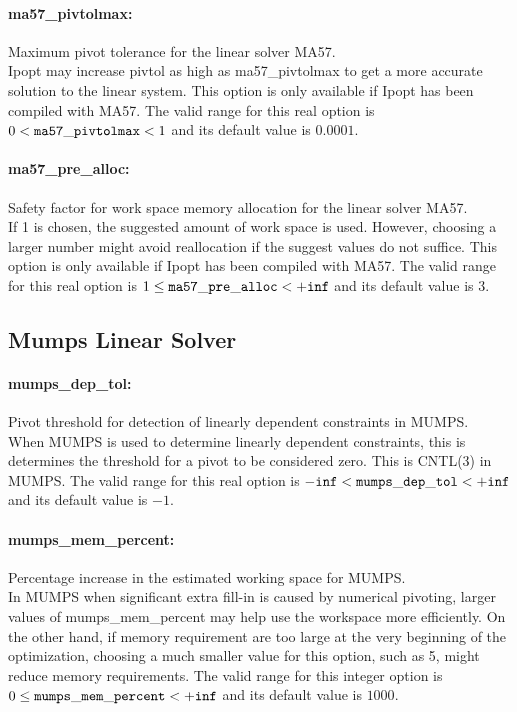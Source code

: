 \paragraph{ma57\_pivtolmax:}\label{sec:ma57_pivtolmax} Maximum pivot tolerance for the linear solver MA57. $\;$ \\
 Ipopt may increase pivtol as high as
ma57\_pivtolmax to get a more accurate solution
to the linear system.  This option is only
available if Ipopt has been compiled with MA57. The valid range for this real option is 
$0 <  {\tt ma57\_pivtolmax } <  1$
and its default value is $0.0001$.


\paragraph{ma57\_pre\_alloc:}\label{sec:ma57_pre_alloc} Safety factor for work space memory allocation for the linear solver MA57. $\;$ \\
 If 1 is chosen, the suggested amount of work
space is used.  However, choosing a larger number
might avoid reallocation if the suggest values do
not suffice.  This option is only available if
Ipopt has been compiled with MA57. The valid range for this real option is 
$1 \le {\tt ma57\_pre\_alloc } <  {\tt +inf}$
and its default value is $3$.


\subsection{Mumps Linear Solver}
\label{sec:Mumps_Linear_Solver}
\paragraph{mumps\_dep\_tol:}\label{sec:mumps_dep_tol} Pivot threshold for detection of linearly dependent constraints in MUMPS. $\;$ \\
 When MUMPS is used to determine linearly
dependent constraints, this is determines the
threshold for a pivot to be considered zero. 
This is CNTL(3) in MUMPS. The valid range for this real option is 
${\tt -inf} <  {\tt mumps\_dep\_tol } <  {\tt +inf}$
and its default value is $-1$.


\paragraph{mumps\_mem\_percent:}\label{sec:mumps_mem_percent} Percentage increase in the estimated working space for MUMPS. $\;$ \\
 In MUMPS when significant extra fill-in is caused
by numerical pivoting, larger values of
mumps\_mem\_percent may help use the workspace
more efficiently.  On the other hand, if memory
requirement are too large at the very beginning
of the optimization, choosing a much smaller
value for this option, such as 5, might reduce
memory requirements. The valid range for this integer option is
$0 \le {\tt mumps\_mem\_percent } <  {\tt +inf}$
and its default value is $1000$.


